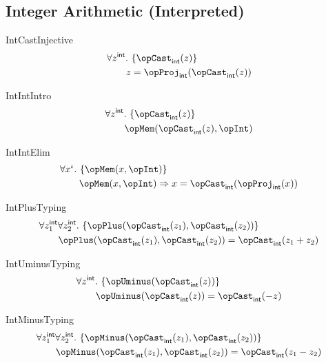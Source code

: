 \documentclass[11pt, a4paper, oneside]{article}
\begin{document}
    \subsection{Integer Arithmetic (Interpreted)}
    \label{subsec:ints_interpreted}

\begin{axioms}
\item[IntCastInjective] \[
        \begin{aligned}
            &\forall z^\int.\, \st{ \opCast_\int(z) } \\
            &\qquad z = \opProj_\int(\opCast_\int(z))
        \end{aligned}
    \]

\item[IntIntIntro] \[
        \begin{aligned}
            &\forall z^\int.\, \st{ \opCast_\int(z) } \\
            &\qquad \opMem(\opCast_\int(z), \opInt)
        \end{aligned}
    \]

\item[IntIntElim] \[
        \begin{aligned}
            &\forall x^\idv.\, \st{ \opMem(x, \opInt) } \\
            &\qquad \opMem(x, \opInt) \imp x = \opCast_\int(\opProj_\int(x))
        \end{aligned}
    \]

\item[IntPlusTyping] \[
        \begin{aligned}
            &\forall z_1^\int \forall z_2^\int.\, \st{ \opPlus(\opCast_\int(z_1), \opCast_\int(z_2)) } \\
            &\qquad \opPlus(\opCast_\int(z_1), \opCast_\int(z_2)) = \opCast_\int(z_1 + z_2)
        \end{aligned}
    \]

\item[IntUminusTyping] \[
        \begin{aligned}
            &\forall z^\int.\, \st{ \opUminus(\opCast_\int(z)) } \\
            &\qquad \opUminus(\opCast_\int(z)) = \opCast_\int(- z)
        \end{aligned}
    \]

\item[IntMinusTyping] \[
        \begin{aligned}
            &\forall z_1^\int \forall z_2^\int.\, \st{ \opMinus(\opCast_\int(z_1), \opCast_\int(z_2)) } \\
            &\qquad \opMinus(\opCast_\int(z_1), \opCast_\int(z_2)) = \opCast_\int(z_1 - z_2)
        \end{aligned}
    \]


\end{axioms}
\end{document}
